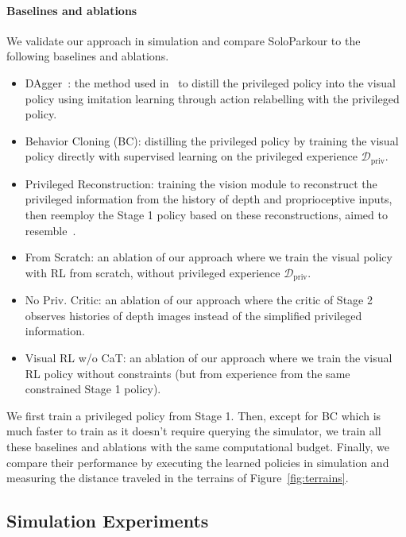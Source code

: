 \paragraph{Baselines and ablations}
We validate our approach in simulation and compare SoloParkour to the following baselines and ablations.
\begin{itemize}[topsep=-4pt,itemsep=1pt,partopsep=0pt, parsep=0pt]
    \item DAgger~\citep{ross2011reduction}: the method used in~\citep{cheng2023parkour, zhuang2023robot, agarwal2023legged} to distill the privileged policy into the visual policy using imitation learning through action relabelling with the privileged policy.
    \item Behavior Cloning (BC): distilling the privileged policy by training the visual policy directly with supervised learning on the privileged experience $\mathcal{D}_\text{priv}$.
    \item Privileged Reconstruction: training the vision module to reconstruct the privileged information from the history of depth and proprioceptive inputs, then reemploy the Stage 1 policy based on these reconstructions, aimed to resemble~\cite{agarwal2023legged, duan2023learning}.
    \item From Scratch: an ablation of our approach where we train the visual policy with RL from scratch, without privileged experience $\mathcal{D}_\text{priv}$.
    \item No Priv. Critic: an ablation of our approach where the critic of Stage 2 observes histories of depth images instead of the simplified privileged information.
    \item Visual RL w/o CaT: an ablation of our approach where we train the visual RL policy without constraints (but from experience from the same constrained Stage 1 policy).
\end{itemize}
We first train a privileged policy from Stage 1.
Then, except for BC which is much faster to train as it doesn't require querying the simulator, we train all these baselines and ablations with the same computational budget.
Finally, we compare their performance by executing the learned policies in simulation and measuring the distance traveled in the terrains of Figure~\ref{fig:terrains}.


\subsection{Simulation Experiments}



